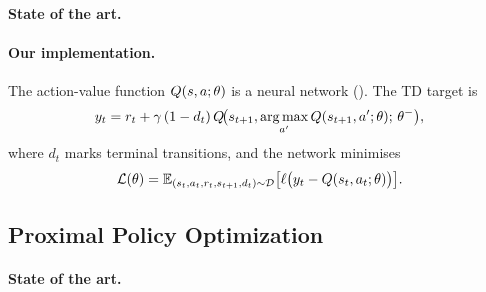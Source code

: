 \paragraph{State of the art.}

\paragraph{Our implementation.}
The action-value function $Q(s, a; \theta)$ is a neural network (). The TD target is
\begin{equation}
  y_t = r_t + \gamma\,(1 - d_t)\,Q\!\bigl(s_{t+1}, \operatorname*{arg\,max}_{a'} Q(s_{t+1}, a'; \theta);\, \theta^{-}\bigr),
  \label{eq:ddqn-target}
\end{equation}
where $d_t$ marks terminal transitions, and the network minimises
\begin{equation}
  \mathcal{L}(\theta) = \mathbb{E}_{(s_t,a_t,r_t,s_{t+1},d_t)\sim\mathcal{D}}\bigl[\ell\bigl(y_t - Q(s_t, a_t; \theta)\bigr)\bigr].
  \label{eq:ddqn-loss}
\end{equation}

\subsection{Proximal Policy Optimization}\label{sec:ppo}

\paragraph{State of the art.}

